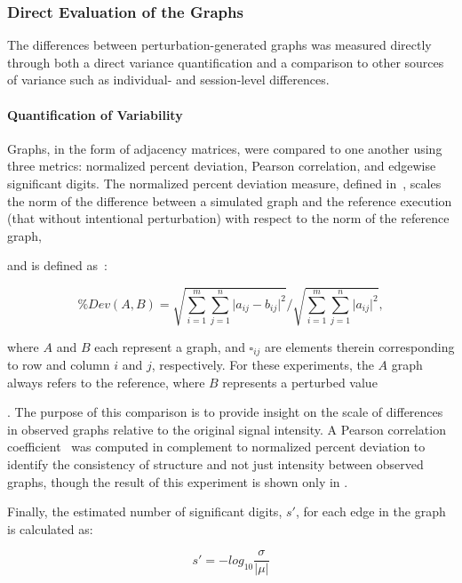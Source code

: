 \documentclass[fleqn,10pt]{SelfArx} %
\newcommand{\new}[1]{{#1}}
\begin{document}
\subsubsection*{Direct Evaluation of the Graphs}

The differences between \new{perturbation-generated} graphs was measured directly through both a direct variance quantification and a
comparison to other sources of variance such as individual- and session-level differences.

\paragraph{Quantification of Variability}
Graphs, in the form of adjacency matrices, were compared to one another using three metrics: normalized percent
deviation, Pearson correlation, and edgewise significant digits. The normalized percent deviation measure, defined
in~\cite{Kiar2020-lb}, scales the norm of the difference between a simulated graph and the reference execution (that
without intentional perturbation) with respect to the norm of the reference graph, \new{and is defined as~\cite{Kiar2020-lb}:

\begin{equation}
\% Dev (A, B) = \sqrt{\sum_{i=1}^m\sum_{j=1}^n \lvert a_{ij} - b_{ij} \rvert^2 } / \sqrt{\sum_{i=1}^m\sum_{j=1}^n \lvert a_{ij} \rvert^2},
\label{eq:eval}
\end{equation}

where $A$ and $B$ each represent a graph, and $\square_{ij}$ are elements therein corresponding to row and column
$i$ and $j$, respectively. For these experiments, the $A$ graph always refers to the reference, where $B$ represents a
perturbed value}. The purpose of this comparison is
to provide insight on the scale of differences in observed graphs relative to the original signal intensity. A Pearson
correlation coefficient~\cite{Benesty2009-cb} was computed in complement to normalized percent deviation to identify
the consistency of structure and not just intensity between observed graphs, \new{though the result of this experiment
is shown only in \sref{supsec:correlation}}.

Finally, the estimated number of significant digits, $s'$, for each edge in the graph is calculated as:

\begin{equation}
s' = -log_{10}\frac{\sigma}{\lvert\mu\rvert}
\label{eq:sigdig}
\end{equation}
\end{document}
